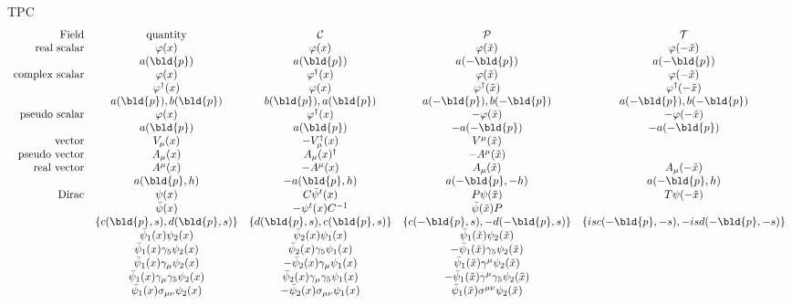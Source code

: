 TPC
\begin{equation*}
\begin{array}{rcccc}
\mbox{Field} & \mbox{quantity} & {\cal C} & {\cal P} & {\cal T}\\
\mbox{real scalar} & \varphi(x) & \varphi(x) & \varphi(\tilde{x}) & \varphi(-\tilde{x})\\
	&a(\bld{p})&a(\bld{p})& a(-\bld{p})&a(-\bld{p})\\
\mbox{complex scalar}&\varphi(x)& \varphi^\dagger(x)&\varphi(\tilde{x}) &\varphi(-\tilde{x})\\
	&\varphi^\dagger(x)&\varphi(x)&\varphi^\dagger(\tilde{x})&\varphi^\dagger(-\tilde{x})\\
	&a(\bld{p}), b(\bld{p})&b(\bld{p}), a(\bld{p})&a(-\bld{p}), b(-\bld{p})&a(-\bld{p}), b(-\bld{p})\\
\mbox{pseudo scalar}&\varphi(x)& \varphi^\dagger(x)&-\varphi(\tilde{x}) &-\varphi(-\tilde{x})\\
	&a(\bld{p})&a(\bld{p})& -a(-\bld{p})&-a(-\bld{p})\\
\mbox{vector}&V_\mu(x)&-V^\dagger_\mu(x)&V^\mu(\tilde{x})&\\
\mbox{pseudo vector}&A_\mu(x)&A_\mu(x)^\dagger&-A^\mu(\tilde{x})&\\
\mbox{real vector}&A^\mu(x)&-A^\mu(x)&A_\mu(\tilde{x})&A_\mu(-\tilde{x})\\
	&a(\bld{p}, h)&-a(\bld{p}, h)&a(-\bld{p}, -h)&a(-\bld{p}, h)\\
\mbox{Dirac}&\psi(x)&C\bar{\psi}^t(x)&P\psi(\tilde{x})&T\psi(-\tilde{x})\\
	&\bar\psi(x)&-{\psi}^t(x) C^{-1}&\bar{\psi}(\tilde{x})P&\\
	&\{c(\bld{p}, s), d(\bld{p}, s)\}&\{ d(\bld{p}, s), c(\bld{p}, s) \}
	&\{c(-\bld{p}, s), -d(-\bld{p}, s)\}&\{is c(-\bld{p}, -s), -is d(-\bld{p}, -s)\}\\
	&\bar{\psi}_1(x) \psi_2(x)&\bar{\psi}_2(x) \psi_1(x)&\bar{\psi}_1(\tilde{x}) \psi_2(\tilde{x})&\\
	&\bar{\psi}_1(x) \gamma_5 \psi_2(x)&\bar{\psi}_2(x) \gamma_5 \psi_1(x)&
	-\bar{\psi}_1(\tilde{x}) \gamma_5 \psi_2(\tilde{x})&\\
	&\bar{\psi}_1(x) \gamma_\mu \psi_2(x)&-\bar{\psi}_2(x) \gamma_\mu \psi_1(x)&	
	\bar{\psi}_1(\tilde{x}) \gamma^\mu \psi_2(\tilde{x})&\\
	&\bar{\psi}_1(x) \gamma_\mu \gamma_5 \psi_2(x)&
	\bar{\psi}_2(x) \gamma_\mu \gamma_5 \psi_1(x)
	&-\bar{\psi}_1(\tilde{x}) \gamma^\mu \gamma_5 \psi_2(\tilde{x})&\\
	&\bar{\psi}_1(x) \sigma_{\mu \nu} \psi_2(x)&
	-\bar{\psi}_2(x) \sigma_{\mu \nu} \psi_1(x)
	&\bar{\psi}_1(\tilde{x})  \sigma^{\mu \nu} \psi_2(\tilde{x})&\\
	&&&&\\
	&&&&\\
\end{array}
\end{equation*}
